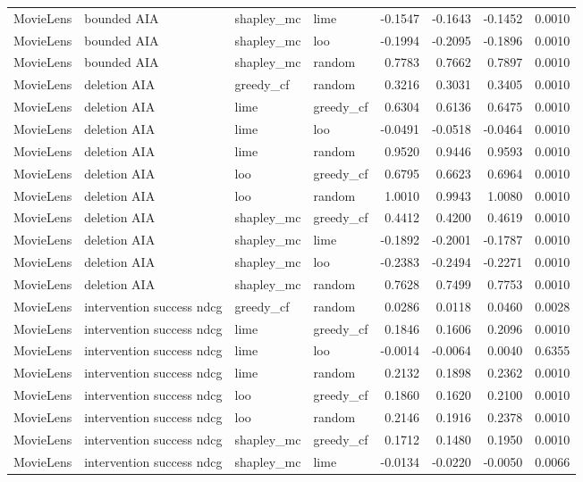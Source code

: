 \begin{longtable}{@{}p{}p{}p{}p{}rrrr@{}}
MovieLens & bounded AIA & shapley\_mc & lime & -0.1547 & -0.1643 & -0.1452 & 0.0010 \\
MovieLens & bounded AIA & shapley\_mc & loo & -0.1994 & -0.2095 & -0.1896 & 0.0010 \\
MovieLens & bounded AIA & shapley\_mc & random & 0.7783 & 0.7662 & 0.7897 & 0.0010 \\
MovieLens & deletion AIA & greedy\_cf & random & 0.3216 & 0.3031 & 0.3405 & 0.0010 \\
MovieLens & deletion AIA & lime & greedy\_cf & 0.6304 & 0.6136 & 0.6475 & 0.0010 \\
MovieLens & deletion AIA & lime & loo & -0.0491 & -0.0518 & -0.0464 & 0.0010 \\
MovieLens & deletion AIA & lime & random & 0.9520 & 0.9446 & 0.9593 & 0.0010 \\
MovieLens & deletion AIA & loo & greedy\_cf & 0.6795 & 0.6623 & 0.6964 & 0.0010 \\
MovieLens & deletion AIA & loo & random & 1.0010 & 0.9943 & 1.0080 & 0.0010 \\
MovieLens & deletion AIA & shapley\_mc & greedy\_cf & 0.4412 & 0.4200 & 0.4619 & 0.0010 \\
MovieLens & deletion AIA & shapley\_mc & lime & -0.1892 & -0.2001 & -0.1787 & 0.0010 \\
MovieLens & deletion AIA & shapley\_mc & loo & -0.2383 & -0.2494 & -0.2271 & 0.0010 \\
MovieLens & deletion AIA & shapley\_mc & random & 0.7628 & 0.7499 & 0.7753 & 0.0010 \\
MovieLens & intervention success ndcg & greedy\_cf & random & 0.0286 & 0.0118 & 0.0460 & 0.0028 \\
MovieLens & intervention success ndcg & lime & greedy\_cf & 0.1846 & 0.1606 & 0.2096 & 0.0010 \\
MovieLens & intervention success ndcg & lime & loo & -0.0014 & -0.0064 & 0.0040 & 0.6355 \\
MovieLens & intervention success ndcg & lime & random & 0.2132 & 0.1898 & 0.2362 & 0.0010 \\
MovieLens & intervention success ndcg & loo & greedy\_cf & 0.1860 & 0.1620 & 0.2100 & 0.0010 \\
MovieLens & intervention success ndcg & loo & random & 0.2146 & 0.1916 & 0.2378 & 0.0010 \\
MovieLens & intervention success ndcg & shapley\_mc & greedy\_cf & 0.1712 & 0.1480 & 0.1950 & 0.0010 \\
MovieLens & intervention success ndcg & shapley\_mc & lime & -0.0134 & -0.0220 & -0.0050 & 0.0066 \\

\end{longtable}
